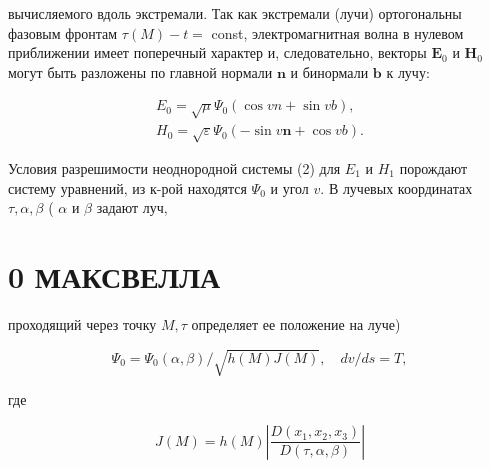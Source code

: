\documentclass[10pt]{article}
\begin{document}
вычисляемого вдоль экстремали. Так как экстремали (лучи) ортогональны фазовым фронтам $\tau(M)-t=$ const, электромагнитная волна в нулевом приближении имеет поперечный характер и, следовательно, векторы $\boldsymbol{E}_{0}$ и $\boldsymbol{H}_{0}$ могут быть разложены по главной нормали $\boldsymbol{n}$ и бинормали $\boldsymbol{b}$ к лучу:



\[

\begin{gathered}

E_{0}=\sqrt{\mu} \Psi_{0}(\cos v n+\sin v b), \\

H_{0}=\sqrt{\varepsilon} \Psi_{0}(-\sin v \boldsymbol{n}+\cos v b) .

\end{gathered}

\]



Условия разрешимости неоднородной системы (2) для $E_{1}$ и $H_{1}$ порождают систему уравнений, из к-рой находятся $\Psi_{0}$ и угол $v$. В лучевых координатах $\tau, \alpha, \beta$ ( $\alpha$ и $\beta$ задают луч,



\section{0 МАКСВЕЛЛА}

проходящий через точку $M, \tau$ определяет ее положение на луче)



\[

\Psi_{0}=\Psi_{0}(\alpha, \beta) / \sqrt{h(M) J(M)}, \quad d v / d s=T,

\]



где



\[

J(M)=h(M)\left|\frac{D\left(x_{1}, x_{2}, x_{3}\right)}{D(\tau, \alpha, \beta)}\right|

\]
\end{document}
